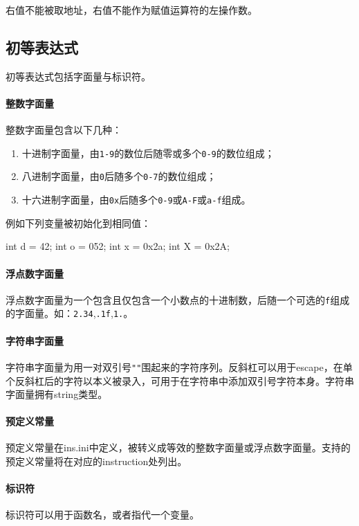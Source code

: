 \documentclass[UTF8]{ctexart}
\begin{document}
右值不能被取地址，右值不能作为赋值运算符的左操作数。

\subsection{初等表达式}

初等表达式包括字面量与标识符。

\paragraph{整数字面量} 整数字面量包含以下几种：

\begin{enumerate}
	\item 十进制字面量，由\verb|1-9|的数位后随零或多个\verb|0-9|的数位组成；
	\item 八进制字面量，由\verb|0|后随多个\verb|0-7|的数位组成；
	\item 十六进制字面量，由\verb|0x|后随多个\verb|0-9|或\verb|A-F|或\verb|a-f|组成。
\end{enumerate}

例如下列变量被初始化到相同值：

\begin{MUAvbt}
int d = 42;
int o = 052;
int x = 0x2a;
int X = 0x2A;
\end{MUAvbt}

\paragraph{浮点数字面量} 浮点数字面量为一个包含且仅包含一个小数点的十进制数，后随一个可选的\verb|f|组成的字面量。如：\verb|2.34|,\verb|.1f|,\verb|1.|。

\paragraph{字符串字面量} 字符串字面量为用一对双引号\verb|""|围起来的字符序列。反斜杠可以用于escape，在单个反斜杠后的字符以本义被录入，可用于在字符串中添加双引号字符本身。字符串字面量拥有string类型。

\paragraph{预定义常量} 预定义常量在ins.ini中定义，被转义成等效的整数字面量或浮点数字面量。支持的预定义常量将在对应的instruction处列出。

\paragraph{标识符} 标识符可以用于函数名，或者指代一个变量。%
\end{document}
